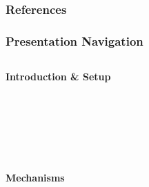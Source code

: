\documentclass{beamer}
\begin{document}
\begin{frame}[allowframebreaks]
    \frametitle{References}
    \small
    \tiny  %
\end{frame}


\begin{frame}
    \label{frame:navigation}
    \frametitle{Presentation Navigation}
    
    \small %
    
    \begin{columns}[T]
        \begin{column}{0.45\textwidth}
            \centering
            \textbf{Introduction \& Setup}
            \vspace{0.1cm}
            
            \hyperlink{frame:motivation}{}\\[2pt]
            \hyperlink{frame:thispaper}{}\\[2pt]
            \hyperlink{frame:contribution}{}\\[2pt]
            \hyperlink{frame:background}{}\\[2pt]
            \hyperlink{frame:data}{}\\[2pt]
            \hyperlink{frame:ece_trends}{}
            
            \vspace{0.2cm}
            \textbf{Mechanisms}
            \vspace{0.1cm}
            
            \hyperlink{frame:mechanisms}{}\\[2pt]
            \hyperlink{frame:birthorder}{}\\[2pt]
            \hyperlink{frame:pcinternet}{}\\[2pt]
            \hyperlink{frame:siblingdisruption}{}\\[2pt]
            \hyperlink{frame:parentaldilution_intro}{} \\[2pt]
            \hyperlink{frame:byses}{}\\[2pt]
            \hyperlink{frame:childcare}{}\\[2pt]
            \hyperlink{frame:delayedentry}{}\\[2pt]
            \hyperlink{frame:incomeshocks}{}          
        \end{column}
        

\end{columns}
\end{frame}
\end{document}
